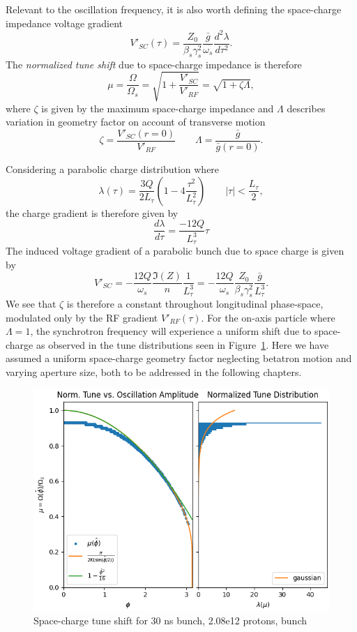 Relevant to the oscillation frequency, it is also worth defining the space-charge impedance voltage gradient \begin{equation}
    V'_{SC}(\tau) = \frac{Z_0}{\beta_s\gamma_s^2}\frac{\bar{g}}{\omega_s}\frac{d^2\lambda}{d\tau^2}.
\end{equation} The \textit{normalized tune shift} due to space-charge impedance is therefore
\begin{equation}
    \mu = \frac{\Omega}{\Omega_s} = \sqrt{1 + \frac{V'_{SC}}{V'_{RF}} }= \sqrt{1 +\zeta\Lambda}
    \label{eq:tune_shift},
\end{equation} 
where $\zeta$ is given by the maximum space-charge impedance and $\Lambda$ describes variation in geometry factor on account of transverse motion
$$\zeta = \frac{V'_{SC}(r=0)}{V'_{RF}} \qquad \Lambda = \frac{\bar{g}}{\bar{g}(r=0)}.$$

Considering a parabolic charge distribution where
$$\lambda(\tau)=\frac{3Q}{2L_\tau}\left(1-4\frac{\tau^2}{L_\tau^2}\right) \qquad |\tau| < \frac{L_\tau}{2},$$
the charge gradient is therefore given by $$\frac{d\lambda}{d\tau} = \frac{-12Q}{L_\tau^3}\tau$$ The induced voltage gradient of a parabolic bunch due to space charge is given by  \cite{lasheen_longitudinal_2016} \begin{equation}
    V'_{SC} = -\frac{12Q}{\omega_s}\frac{\Im (Z)}{n}\frac{1}{L_\tau^3}=-\frac{12Q}{\omega_s}\frac{Z_0}{\beta_s\gamma_s^2}\frac{\bar{g}}{L_\tau^3}
    \label{eq:vp_sc}.
\end{equation} 
We see that $\zeta$ is therefore a constant throughout longitudinal phase-space, modulated only by the RF gradient $V'_{RF}(\tau)$. For the on-axis particle where $\Lambda=1$, the synchrotron frequency will experience a uniform shift due to space-charge as observed in the tune distributions seen in Figure~\ref{fig:tune_shift}. Here we have assumed a uniform space-charge geometry factor neglecting betatron motion and varying aperture size, both to be addressed in the following chapters.

\begin{figure}
    \centering
    \includegraphics{figs/tune_shift/normalized_tune.png}
    \caption{Space-charge tune shift for 30 ns bunch, 2.08e12 protons, bunch}
    \label{fig:tune_shift}
\end{figure}

